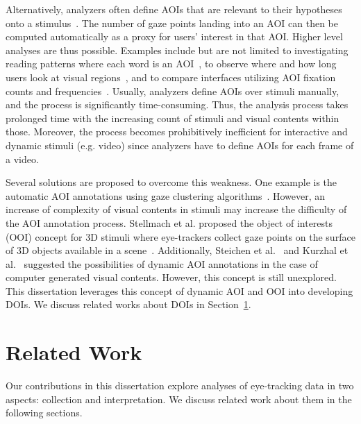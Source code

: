 Alternatively, analyzers often define AOIs that are relevant to their hypotheses onto a stimulus~\cite{Bla14}. The number of gaze points landing into an AOI can then be computed automatically as a proxy for users' interest in that AOI. Higher level analyses are thus possible. Examples include but are not limited to investigating reading patterns where each word is an AOI~\cite{Bey05, San04}, to observe where and how long users look at visual regions~\cite{Coco09, Kim12}, and to compare interfaces utilizing AOI fixation counts and frequencies~\cite{Coletkin09}. Usually, analyzers define AOIs over stimuli manually, and the process is significantly time-consuming. Thus, the analysis process takes prolonged time with the increasing count of stimuli and visual contents within those. Moreover, the process becomes prohibitively inefficient for interactive and dynamic stimuli (e.g. video) since analyzers have to define AOIs for each frame of a video.    
  
Several solutions are proposed to overcome this weakness. One example is the automatic AOI annotations using gaze clustering algorithms~\cite{Pri00, San04, Dru14}. However, an increase of complexity of visual contents in stimuli may increase the difficulty of the AOI annotation process. Stellmach et al. proposed the object of interests (OOI) concept for 3D stimuli where eye-trackers collect gaze points on the surface of 3D objects available in a scene~\cite{Ste10}. Additionally, Steichen et al.~\cite{Ste13} and Kurzhal et al.~\cite{Kur14} suggested the possibilities of dynamic AOI annotations in the case of computer generated visual contents. However, this concept is still unexplored. This dissertation leverages this concept of dynamic AOI and OOI into developing DOIs. We discuss related works about DOIs in Section~\ref{sec:RelatedWorks}.

\section{Related Work}
\label{sec:RelatedWorks}
Our contributions in this dissertation explore analyses of eye-tracking data in two aspects: collection and interpretation. We discuss related work about them in the following sections.

